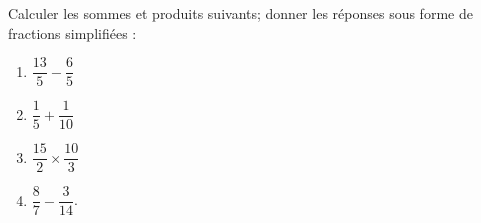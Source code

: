 
\begin{exercice}\label{exo2smath-0063}

    Calculer les sommes et produits suivants; donner les réponses sous forme de fractions simplifiées :
    \begin{multicols}{4}
        \begin{enumerate}
            \item
                \( \dfrac{ 13 }{ 5 }-\dfrac{ 6 }{ 5 }\)
            \item
                \( \dfrac{ 1 }{ 5 }+\dfrac{ 1 }{ 10 } \)
            \item
                \( \dfrac{ 15 }{ 2 }\times \dfrac{ 10 }{ 3 }\)
            \item
                \( \dfrac{ 8 }{ 7 } - \dfrac{ 3 }{ 14 }\).
        \end{enumerate}
    \end{multicols}

\end{exercice}
